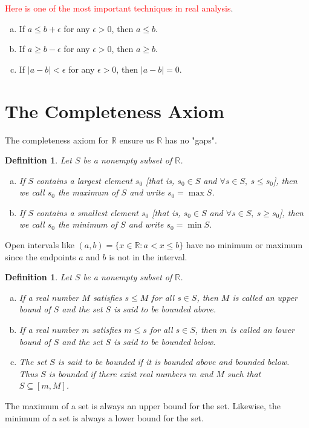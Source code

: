 \documentclass[12pt, lettersize]{book}
\newtheorem{dfn}[thm]{Definition}
\newcommand{\R}{\mathbb{R}}
\begin{document}
	\begin{tcolorbox}
		\textcolor{red}{Here is one of the most important techniques in real analysis}.
		\begin{enumerate}[(a)]
			\item If $a\leq b+\epsilon$ for any $\epsilon>0$, then $a\leq b$.
			\item If $a\geq b-\epsilon$ for any $\epsilon>0$, then $a\geq b$.
			\item If $|a-b|<\epsilon$ for any $\epsilon>0$, then $|a-b|=0$.
		\end{enumerate}
	\end{tcolorbox}
	
	\newpage
	\section{The Completeness Axiom}
	The completeness axiom for $\R$ ensure us $\R$ has no "gaps".
	\begin{dfn}\label{def:4.1}
		Let $S$ be a nonempty subset of $\R$.
		\begin{enumerate}[(a)]
			\item If $S$ contains a largest element $s_0$ [that is, $s_0\in S$ and $\forall s\in S,\ s\leq s_0$], then we call $s_0$ the \emph{maximum} of $S$ and write $s_0=\max S$.
			\item If $S$ contains a smallest element $s_0$ [that is, $s_0\in S$ and $\forall s\in S,\ s\geq s_0$], then we call $s_0$ the \emph{minimum} of $S$ and write $s_0=\min S$. 
		\end{enumerate}
	\end{dfn}
	Open intervals like $(a,b)=\{x\in\R: a<x\leq b\}$ have no minimum or maximum since the endpoints $a$ and $b$ is not in the interval.
	
	\begin{dfn}\label{def:4.2}
		Let $S$ be a nonempty subset of $\R$.
		\begin{enumerate}[(a)]
			\item If a real number $M$ satisfies $s\leq M$ for all $s\in S$, then $M$ is called an \emph{upper bound} of $S$ and the set $S$ is said to be \emph{bounded above}.
			\item If a real number $m$ satisfies $m\leq s$ for all $s\in S$, then $m$ is called an \emph{lower bound} of $S$ and the set $S$ is said to be \emph{bounded below}.
			\item The set $S$ is said to be \emph{bounded} if it is bounded above and bounded below. Thus $S$ is bounded if there exist real numbers $m$ and $M$ such that $S\subseteq[m,M]$.
		\end{enumerate}
	\end{dfn}
	The maximum of a set is always an upper bound for the set. Likewise, the minimum of a set is always a lower bound for the set.
	
\end{document}
